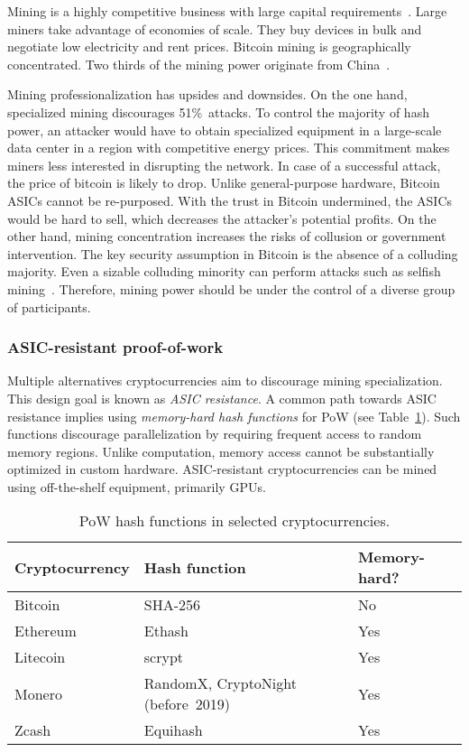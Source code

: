 Mining is a highly competitive business with large capital requirements~\cite{Kroll2013}.
Large miners take advantage of economies of scale.
They buy devices in bulk and negotiate low electricity and rent prices.
Bitcoin mining is geographically concentrated.
Two thirds of the mining power originate from China~\cite{Rauchs2020}.

Mining professionalization has upsides and downsides.
On the one hand, specialized mining discourages 51\%~attacks.
To control the majority of hash power, an attacker would have to obtain specialized equipment in a large-scale data center in a region with competitive energy prices.
This commitment makes miners less interested in disrupting the network.
In case of a successful attack, the price of bitcoin is likely to drop.
Unlike general-purpose hardware, Bitcoin ASICs cannot be re-purposed.
With the trust in Bitcoin undermined, the ASICs would be hard to sell, which decreases the attacker's potential profits.
On the other hand, mining concentration increases the risks of collusion or government intervention.
The key security assumption in Bitcoin is the absence of a colluding majority.
Even a sizable colluding minority can perform attacks such as selfish mining~\cite{Eyal2018}.
Therefore, mining power should be under the control of a diverse group of participants.


\subsubsection*{ASIC-resistant proof-of-work}

Multiple alternatives cryptocurrencies aim to discourage mining specialization.
This design goal is known as \textit{ASIC resistance}.
A common path towards ASIC resistance implies using \textit{memory-hard hash functions} for PoW (see Table~\ref{tab:pow-coins-hash-functions}).
Such functions discourage parallelization by requiring frequent access to random memory regions.
Unlike computation, memory access cannot be substantially optimized in custom hardware.
ASIC-resistant cryptocurrencies can be mined using off-the-shelf equipment, primarily GPUs.

\begin{table}[]
	\caption{PoW hash functions in selected cryptocurrencies.}
	\begin{tabular}{|l|l|l|}
		\hline
		\textbf{Cryptocurrency} & \textbf{Hash function} & \textbf{Memory-hard?} \\ \hline
		Bitcoin & SHA-256 & No \\ \hline
		Ethereum & Ethash & Yes \\ \hline
		Litecoin & scrypt & Yes \\ \hline
		Monero & RandomX, CryptoNight (before~2019) & Yes \\ \hline
		Zcash & Equihash & Yes \\ \hline
	\end{tabular}
	\label{tab:pow-coins-hash-functions}
\end{table}

